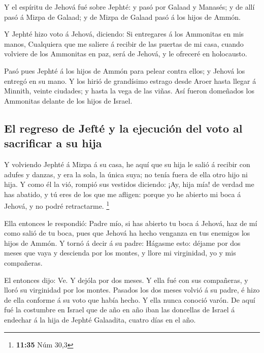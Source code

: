  Y el espíritu de Jehová fué sobre Jephté: y pasó por
Galaad y Manasés; y de allí pasó á Mizpa de Galaad; y de Mizpa de Galaad
pasó á los hijos de Ammón.

 Y Jephté hizo voto á Jehová, diciendo: Si entregares á los
Ammonitas en mis manos,  Cualquiera que me saliere á
recibir de las puertas de mi casa, cuando volviere de los Ammonitas en
paz, será de Jehová, y le ofreceré en holocausto.

 Pasó pues Jephté á los hijos de Ammón para pelear contra
ellos; y Jehová los entregó en su mano.  Y los hirió de
grandísimo estrago desde Aroer hasta llegar á Minnith, veinte ciudades;
y hasta la vega de las viñas. Así fueron domeñados los Ammonitas delante
de los hijos de Israel.

\hypertarget{el-regreso-de-jeftuxe9-y-la-ejecuciuxf3n-del-voto-al-sacrificar-a-su-hija}{%
\subsection{El regreso de Jefté y la ejecución del voto al sacrificar a
su
hija}\label{el-regreso-de-jeftuxe9-y-la-ejecuciuxf3n-del-voto-al-sacrificar-a-su-hija}}

 Y volviendo Jephté á Mizpa á su casa, he aquí que su hija
le salió á recibir con adufes y danzas, y era la sola, la única suya; no
tenía fuera de ella otro hijo ni hija.  Y como él la vió,
rompió sus vestidos diciendo: ¡Ay, hija mía! de verdad me has abatido, y
tú eres de los que me afligen: porque yo he abierto mi boca á Jehová, y
no podré retractarme. \footnote{\textbf{11:35} Núm 30,3}

 Ella entonces le respondió: Padre mío, si has abierto tu
boca á Jehová, haz de mí como salió de tu boca, pues que Jehová ha hecho
venganza en tus enemigos los hijos de Ammón.  Y tornó á
decir á su padre: Hágasme esto: déjame por dos meses que vaya y
descienda por los montes, y llore mi virginidad, yo y mis compañeras.

 El entonces dijo: Ve. Y dejóla por dos meses. Y ella fué
con sus compañeras, y lloró su virginidad por los montes. 
Pasados los dos meses volvió á su padre, é hizo de ella conforme á su
voto que había hecho. Y ella nunca conoció varón.  De aquí
fué la costumbre en Israel que de año en año iban las doncellas de
Israel á endechar á la hija de Jephté Galaadita, cuatro días en el año.


